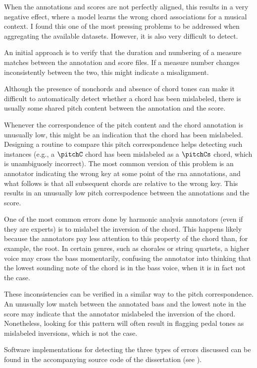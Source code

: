 



When the annotations and scores are not perfectly aligned,
this results in a very negative effect, where a model learns
the wrong chord associations for a musical context. I found
this one of the most pressing problems to be addressed when
aggregating the available datasets. However, it is also very
difficult to detect.

An initial approach is to verify that the duration and
numbering of a measure matches between the annotation and
score files. If a measure number changes inconsistently
between the two, this might indicate a misalignment.


Although the presence of \gls{nonchord}s and absence of
chord tones can make it difficult to automatically detect
whether a chord has been mislabeled, there is usually some
shared pitch content between the annotation and the score.

Whenever the correspondence of the pitch content and the
chord annotation is unusually low, this might be an
indication that the chord has been mislabeled. Designing a
routine to compare this pitch correspondence helps detecting
such instances (e.g., a $\pitchC$ chord has been mislabeled
as a $\pitchCs$ chord, which is unambiguosly incorrect). The
most common version of this problem is an annotator
indicating the wrong key at some point of the \gls{rna}
annotations, and what follows is that all subsequent chords
are relative to the wrong key. This results in an unusually
low pitch correspodence between the annotations and the
score.


One of the most common errors done by harmonic analysis
annotators (even if they are experts) is to mislabel the
inversion of the chord. This happens likely because the
annotators pay less attention to this property of the chord
than, for example, the root. In certain genres, such as
chorales or string quartets, a higher voice may cross the
bass momentarily, confusing the annotator into thinking that
the lowest sounding note of the chord is in the bass voice,
when it is in fact not the case.

These inconsistencies can be verified in a similar way to
the pitch correspondence. An unusually low match between the
annotated bass and the lowest note in the score may indicate
that the annotator mislabeled the inversion of the chord.
Nonetheless, looking for this pattern will often result in
flagging pedal tones as mislabeled inversions, which is not
the case.

Software implementations for detecting the three types of
errors discussed can be found in the accompanying source
code of the dissertation (see
).
